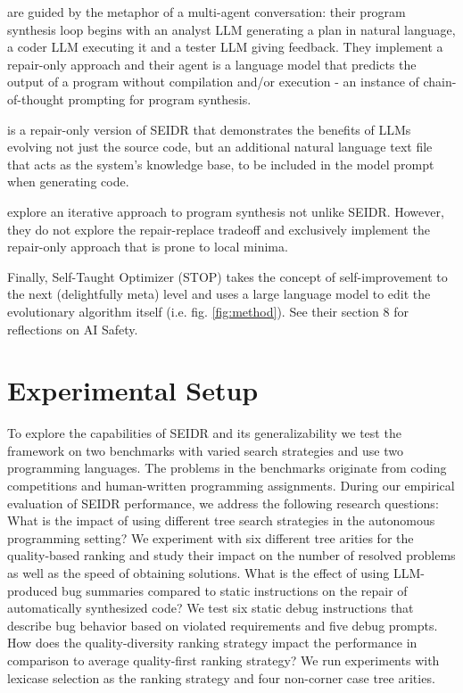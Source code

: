 \cite{dongSelfcollaborationCodeGeneration2023} are guided by the metaphor of a multi-agent conversation: their program synthesis loop begins with an analyst LLM generating a plan in natural language, a coder LLM executing it and a tester LLM giving feedback. They implement a repair-only approach and their \execute{} agent is a language model that predicts the output of a program without compilation and/or execution - an instance of chain-of-thought prompting \cite{yuBetterChainofThoughtPrompting2023} for program synthesis.

\cite{jiangSelfEvolveCodeEvolution2023} is a repair-only version of SEIDR that demonstrates the benefits of LLMs evolving not just the source code, but an additional natural language text file that acts as the system's knowledge base, to be included in the model prompt when generating code.

\cite{xiaConversationalAutomatedProgram2023,chenTeachingLargeLanguage2023,shinnReflexionLanguageAgents2023} explore an iterative approach to program synthesis not unlike SEIDR. However, they do not explore the repair-replace tradeoff and exclusively implement the repair-only approach that is prone to local minima.

Finally, Self-Taught Optimizer (STOP) \cite{zelikmanSelfTaughtOptimizerSTOP2023} takes the concept of self-improvement to the next (delightfully meta) level and uses a large language model to edit the evolutionary algorithm itself (i.e. fig. \ref{fig:method}). See their section 8 for reflections on AI Safety.

\newpage
\section{Experimental Setup}
\label{sec:seidr-eval}

To explore the capabilities of SEIDR and its generalizability  we test the framework on two benchmarks  with varied search strategies and use two programming languages. 
The problems in the benchmarks originate from coding competitions and human-written programming assignments. 
During our empirical evaluation of SEIDR performance, we address the following research questions:
What is the impact of using different tree search strategies
in the autonomous programming setting? 
We experiment with six different tree arities for the quality-based ranking and study their impact on the number of resolved problems as well as the speed of obtaining solutions.
 What is the effect of using LLM-produced bug summaries compared to static instructions on the repair of automatically synthesized code? We test six static debug instructions that describe bug behavior based on violated requirements and five debug prompts. 
How does the quality-diversity ranking strategy impact the performance in comparison to average quality-first ranking strategy? 
We run experiments with lexicase selection as the ranking strategy and four non-corner case tree arities.

